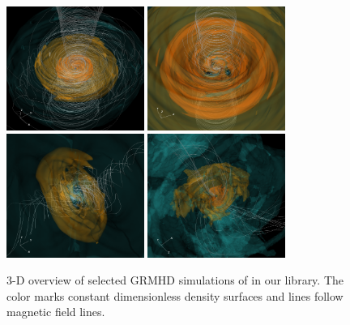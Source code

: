 \begin{figure}
  \centering
  \includegraphics[width=0.4\textwidth]{figures/sane_3D.png}\hspace{1.5pt}%
  \includegraphics[width=0.4\textwidth]{figures/mad_3D_new.png}\\
  \includegraphics[width=0.4\textwidth]{figures/tilted_3D.png}\hspace{1.5pt}%
  \includegraphics[width=0.4\textwidth]{figures/ressler_3D_new.png}
  \caption{3-D overview of selected GRMHD simulations of \sgra in our library.
    The color marks constant dimensionless density surfaces and lines follow magnetic field lines.
}
\end{figure}
